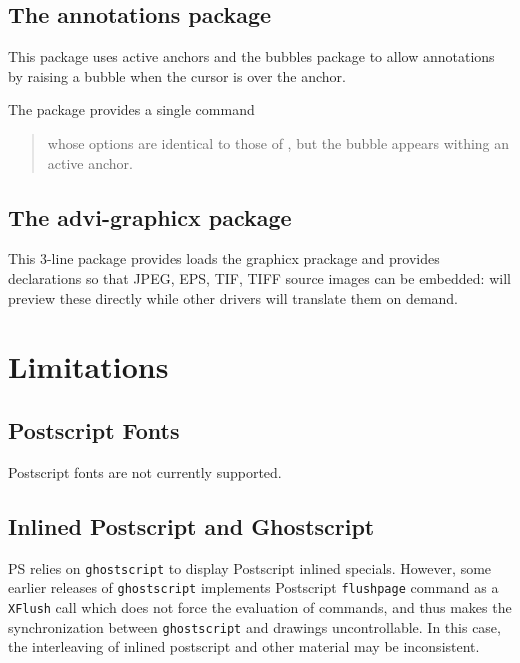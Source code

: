 \documentclass[12pt]{article}
\begin{document}
\medskip \noindent
\docdef \setkeys{}

\subsection{The annotations package}

This package uses active anchors and the bubbles package to 
allow annotations by raising a bubble when the cursor is over the anchor.

The package provides a single command

\medskip\noindent
\docdef \adviannot {}%
\begin{quote}
whose options are identical to those of \docdef \bubble, but the bubble
appears withing an active anchor. 
\end{quote}


\subsection{\label {advi-grahicx}The advi-graphicx package}

This 3-line package provides loads the graphicx prackage and provides
declarations so that JPEG, EPS, TIF, TIFF source images can be embedded:
{\ActiveDVI} will preview these directly while other drivers will translate
them on demand. 

\appendix

\section {Limitations}

\subsection*{Postscript Fonts}

Postscript fonts are not currently supported. 

\subsection*{Inlined Postscript and Ghostscript}

PS relies on {\tt ghostscript} to display Postscript inlined specials.
However, some earlier releases of {\tt ghostscript} 
implements Postscript {\tt flushpage} command as a {\tt XFlush} call
which does not force the evaluation of commands, and thus makes the 
synchronization between {\tt ghostscript} and {\ActiveDVI} drawings 
uncontrollable. In this case, the interleaving of inlined postscript 
and other material may be inconsistent. 
\end{document}
